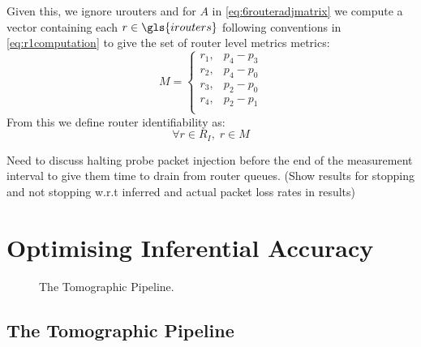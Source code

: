     Given this, we ignore \gls{urouters} and for $A$ in \cref{eq:6routeradjmatrix} we compute a vector containing each $r \in \gls{irouters}$ following conventions in \cref{eq:r1computation} to give the set of router level metrics \gls{metrics}:
    \begin{equation*}
        M = 
        \begin{cases}
        r_1, & p_4-p_3\\
        r_2, & p_4-p_0\\
        r_3, & p_2-p_0\\
        r_4, & p_2-p_1\\
        \end{cases}
    \end{equation*}
    From this we define router identifiability as:
    \begin{equation}
    \label{eq:identifiability}
        \forall r \in R_I,\;r \in M 
    \end{equation}


Need to discuss halting probe packet injection before the end of the measurement interval to give them time to drain from router queues. (Show results for stopping and not stopping w.r.t inferred and actual packet loss rates in results)

\section{Optimising Inferential Accuracy}
\label{sec:Moptprobing}
\begin{figure}[H]
    \centering
    \caption{The Tomographic Pipeline.}
\end{figure}

\subsection{The Tomographic Pipeline}

